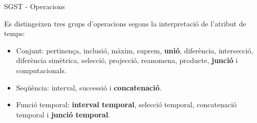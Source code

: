 \begin{frame}{SGST - Operacions}




  Es distingeixen tres grups d'operacions segons la interpretació de l'atribut de temps: 
  \begin{itemize}
  \item Conjunt: pertinença, inclusió, màxim, suprem, \textbf{unió},
    diferència, intersecció, diferència simètrica, selecció,
    projecció, reanomena, producte, \textbf{junció} i computacionals.
  \item Seqüència: interval, successió i \textbf{concatenació}.
  \item Funció temporal: \textbf{interval temporal}, selecció temporal,
    concatenació temporal i \textbf{junció temporal}.
  \end{itemize}


\end{frame}


